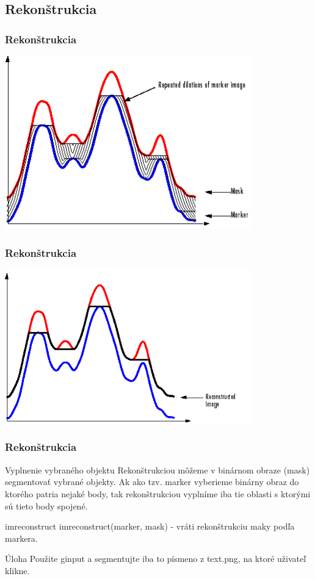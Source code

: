 \documentclass{beamer}
\begin{document}
\subsection{Rekonštrukcia}

\begin{frame}
\frametitle{Rekonštrukcia}
\begin{center}
\includegraphics[width= 0.8\textwidth]{recon.png}
\end{center}
\end{frame}


\begin{frame}
\frametitle{Rekonštrukcia}
\begin{center}
\includegraphics[width= 0.8\textwidth]{recon2.png}
\end{center}
\end{frame}

\begin{frame}
\frametitle{Rekonštrukcia}

  \begin{block}{Vyplnenie vybraného objektu}
  Rekonštrukciou môžeme v binárnom obraze (mask) segmentovať vybrané objekty. Ak ako tzv. marker vyberieme binárny obraz do ktorého patria nejaké body, tak rekonštrukciou vyplníme iba tie oblasti s ktorými sú tieto body spojené.
  \end{block}  
  
  \begin{block}{imreconstruct}
  imreconstruct(marker, mask) - vráti rekonštrukciu maky podľa markera.
  \end{block}  
  
  \begin{block}{Úloha}
  Použite ginput a segmentujte iba to písmeno z text.png, na ktoré uživateľ klikne.
  \end{block}  

\end{frame}
\end{document}
